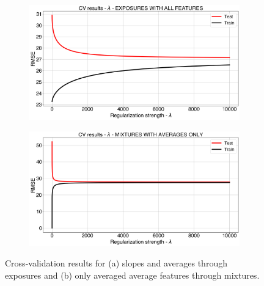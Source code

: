 \begin{figure}[!htb]
	\centering
	
	\begin{subfigure}[t]{0.6\textwidth}
		\includegraphics[width=1\linewidth]{../figures/ridge-cv.png}
		\caption{}
		\label{ridge:pls-cv} 
	\end{subfigure}
	
	\begin{subfigure}[t]{0.6\textwidth}
		\includegraphics[width=1\linewidth]{../figures/ridge-cv-avg-feat.png}
		\caption{}
		\label{fig:ridge-cv-avg-feat}
	\end{subfigure}
	
	\caption{Cross-validation results for (a) slopes and averages through exposures and (b) only averaged average features through mixtures.}
	\label{fig:ridge-cv-both}
\end{figure}

